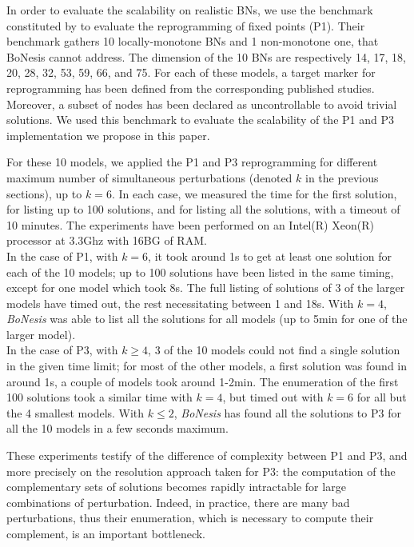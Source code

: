 \documentclass[PCJ,Unicode,screen,mode=plain]{cedram}
\begin{document}
In order to evaluate the scalability on realistic BNs, we use the
benchmark constituted by \citet{Moon22} to evaluate the reprogramming of
fixed points (P1). Their benchmark gathers 10 locally-monotone BNs and 1
non-monotone one, that BoNesis cannot address. The dimension of the 10
BNs are respectively 14, 17, 18, 20, 28, 32, 53, 59, 66, and 75. For
each of these models, a target marker for reprogramming has been defined
from the corresponding published studies. Moreover, a subset of nodes
has been declared as uncontrollable to avoid trivial solutions. We used
this benchmark to evaluate the scalability of the P1 and P3
implementation we propose in this paper.

For these 10 models, we applied the P1 and P3 reprogramming for
different maximum number of simultaneous perturbations (denoted \(k\) in
the previous sections), up to \(k=6\). In each case, we measured the
time for the first solution, for listing up to 100 solutions, and for
listing all the solutions, with a timeout of 10 minutes. The experiments
have been performed on an Intel(R) Xeon(R) processor at 3.3Ghz with 16BG
of RAM.\\
In the case of P1, with \(k=6\), it took around 1s to get at least one
solution for each of the 10 models; up to 100 solutions have been listed
in the same timing, except for one model which took 8s. The full listing
of solutions of 3 of the larger models have timed out, the rest
necessitating between 1 and 18s. With \(k=4\), \emph{BoNesis} was able
to list all the solutions for all models (up to 5min for one of the
larger model).\\
In the case of P3, with \(k\geq 4\), 3 of the 10 models could not find a
single solution in the given time limit; for most of the other models, a
first solution was found in around 1s, a couple of models took around
1-2min. The enumeration of the first 100 solutions took a similar time
with \(k=4\), but timed out with \(k=6\) for all but the 4 smallest
models. With \(k\leq 2\), \emph{BoNesis} has found all the solutions to
P3 for all the 10 models in a few seconds maximum.

These experiments testify of the difference of complexity between P1 and
P3, and more precisely on the resolution approach taken for P3: the
computation of the complementary sets of solutions becomes rapidly
intractable for large combinations of perturbation. Indeed, in practice,
there are many bad perturbations, thus their enumeration, which is
necessary to compute their complement, is an important bottleneck.
\end{document}
